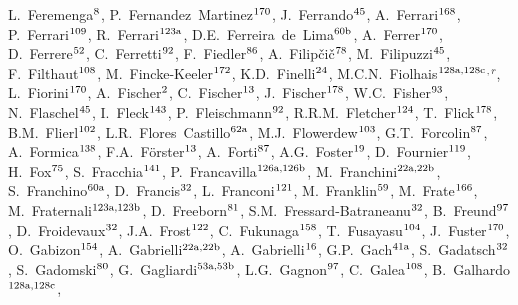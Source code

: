 \begin{flushleft}
L.~Feremenga$^\textrm{\scriptsize 8}$,
P.~Fernandez~Martinez$^\textrm{\scriptsize 170}$,
J.~Ferrando$^\textrm{\scriptsize 45}$,
A.~Ferrari$^\textrm{\scriptsize 168}$,
P.~Ferrari$^\textrm{\scriptsize 109}$,
R.~Ferrari$^\textrm{\scriptsize 123a}$,
D.E.~Ferreira~de~Lima$^\textrm{\scriptsize 60b}$,
A.~Ferrer$^\textrm{\scriptsize 170}$,
D.~Ferrere$^\textrm{\scriptsize 52}$,
C.~Ferretti$^\textrm{\scriptsize 92}$,
F.~Fiedler$^\textrm{\scriptsize 86}$,
A.~Filip\v{c}i\v{c}$^\textrm{\scriptsize 78}$,
M.~Filipuzzi$^\textrm{\scriptsize 45}$,
F.~Filthaut$^\textrm{\scriptsize 108}$,
M.~Fincke-Keeler$^\textrm{\scriptsize 172}$,
K.D.~Finelli$^\textrm{\scriptsize 24}$,
M.C.N.~Fiolhais$^\textrm{\scriptsize 128a,128c}$$^{,r}$,
L.~Fiorini$^\textrm{\scriptsize 170}$,
A.~Fischer$^\textrm{\scriptsize 2}$,
C.~Fischer$^\textrm{\scriptsize 13}$,
J.~Fischer$^\textrm{\scriptsize 178}$,
W.C.~Fisher$^\textrm{\scriptsize 93}$,
N.~Flaschel$^\textrm{\scriptsize 45}$,
I.~Fleck$^\textrm{\scriptsize 143}$,
P.~Fleischmann$^\textrm{\scriptsize 92}$,
R.R.M.~Fletcher$^\textrm{\scriptsize 124}$,
T.~Flick$^\textrm{\scriptsize 178}$,
B.M.~Flierl$^\textrm{\scriptsize 102}$,
L.R.~Flores~Castillo$^\textrm{\scriptsize 62a}$,
M.J.~Flowerdew$^\textrm{\scriptsize 103}$,
G.T.~Forcolin$^\textrm{\scriptsize 87}$,
A.~Formica$^\textrm{\scriptsize 138}$,
F.A.~F\"orster$^\textrm{\scriptsize 13}$,
A.~Forti$^\textrm{\scriptsize 87}$,
A.G.~Foster$^\textrm{\scriptsize 19}$,
D.~Fournier$^\textrm{\scriptsize 119}$,
H.~Fox$^\textrm{\scriptsize 75}$,
S.~Fracchia$^\textrm{\scriptsize 141}$,
P.~Francavilla$^\textrm{\scriptsize 126a,126b}$,
M.~Franchini$^\textrm{\scriptsize 22a,22b}$,
S.~Franchino$^\textrm{\scriptsize 60a}$,
D.~Francis$^\textrm{\scriptsize 32}$,
L.~Franconi$^\textrm{\scriptsize 121}$,
M.~Franklin$^\textrm{\scriptsize 59}$,
M.~Frate$^\textrm{\scriptsize 166}$,
M.~Fraternali$^\textrm{\scriptsize 123a,123b}$,
D.~Freeborn$^\textrm{\scriptsize 81}$,
S.M.~Fressard-Batraneanu$^\textrm{\scriptsize 32}$,
B.~Freund$^\textrm{\scriptsize 97}$,
D.~Froidevaux$^\textrm{\scriptsize 32}$,
J.A.~Frost$^\textrm{\scriptsize 122}$,
C.~Fukunaga$^\textrm{\scriptsize 158}$,
T.~Fusayasu$^\textrm{\scriptsize 104}$,
J.~Fuster$^\textrm{\scriptsize 170}$,
O.~Gabizon$^\textrm{\scriptsize 154}$,
A.~Gabrielli$^\textrm{\scriptsize 22a,22b}$,
A.~Gabrielli$^\textrm{\scriptsize 16}$,
G.P.~Gach$^\textrm{\scriptsize 41a}$,
S.~Gadatsch$^\textrm{\scriptsize 32}$,
S.~Gadomski$^\textrm{\scriptsize 80}$,
G.~Gagliardi$^\textrm{\scriptsize 53a,53b}$,
L.G.~Gagnon$^\textrm{\scriptsize 97}$,
C.~Galea$^\textrm{\scriptsize 108}$,
B.~Galhardo$^\textrm{\scriptsize 128a,128c}$,
$$
\end{flushleft}
